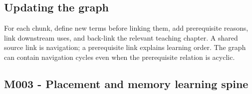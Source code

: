 \subsection{Updating the graph}\label{appendix-4ad47bdd269a-updating-the-graph}

\hypertarget{appendix-4ad47bdd269a-updating-the-graph}{}

For each chunk, define new terms before linking them, add prerequisite reasons, link downstream uses, and back-link the relevant teaching chapter. A shared source link is navigation; a prerequisite link explains learning order. The graph can contain navigation cycles even when the prerequisite relation is acyclic.

\subsection{M003 - Placement and memory learning spine}\label{appendix-4ad47bdd269a-m003---placement-and-memory-learning-spine}

\hypertarget{appendix-4ad47bdd269a-m003---placement-and-memory-learning-spine}{}

